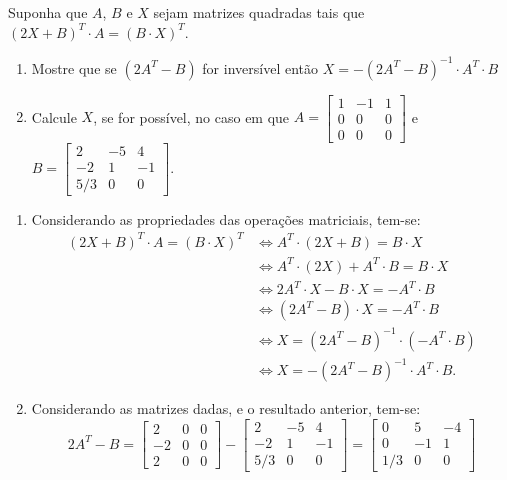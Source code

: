 \documentclass[12pt,a4paper]{article}
\begin{document}
\begin{ExerciseList}
\Exercise[title={2,5}] Suponha que $A$, $B$ e $X$ sejam matrizes quadradas tais que $(2X + B)^T \cdot A = (B \cdot X)^T$.
\begin{enumerate}
\item Mostre que se $(2A^T - B)$ for inversível então $X = -(2A^T - B)^{-1} \cdot A^T \cdot B$
\item Calcule $X$, se for possível, no caso em que $A =
\begin{bmatrix}
1 & -1 & 1 \\
0 &  0 & 0 \\
0 &  0 & 0
\end{bmatrix}$ e $B =
\begin{bmatrix}
  2 & -5 &  4 \\
 -2 &  1 & -1 \\
5/3 &  0 &  0
\end{bmatrix}
$.
\end{enumerate}
\Answer
\begin{enumerate}
\item Considerando as propriedades das operações matriciais, tem-se:
\begin{align*}
  (2X + B)^T \cdot A = (B \cdot X)^T
& \Leftrightarrow
  A^T \cdot (2X + B) = B \cdot X \\
& \Leftrightarrow
  A^T \cdot (2X) + A^T \cdot B = B \cdot X \\
& \Leftrightarrow
  2 A^T \cdot X - B \cdot X = -A^T \cdot B \\
& \Leftrightarrow
  (2 A^T - B) \cdot X = -A^T \cdot B \\
& \Leftrightarrow
  X = (2 A^T - B)^{-1} \cdot (-A^T \cdot B) \\
& \Leftrightarrow
  X = - (2 A^T - B)^{-1} \cdot A^T \cdot B.
\end{align*}
\item Considerando as matrizes dadas, e o resultado anterior, tem-se:
\[
2A^T - B =
\begin{bmatrix}
 2 & 0 & 0 \\
-2 & 0 & 0 \\
 2 & 0 & 0
\end{bmatrix}
-
\begin{bmatrix}
  2 & -5 &  4 \\
 -2 &  1 & -1 \\
5/3 &  0 &  0
\end{bmatrix}
=
\begin{bmatrix}
  0 &  5 & -4 \\
  0 & -1 &  1 \\
1/3 &  0 &  0

\end{bmatrix}\]
\end{enumerate}
\end{ExerciseList}
\end{document}
